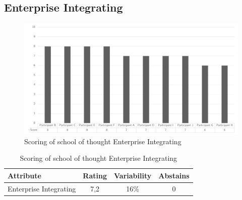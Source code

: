 \subsection{Enterprise Integrating}
\begin{figure}[h!]
	\centering
	\includegraphics[width=0.9\linewidth]{images/scoreeaschoolenterpriseintegrating}
	\caption[Scoring of school of thought Enterprise Integrating]{Scoring of school of thought Enterprise Integrating}
	\label{fig:appscoringschoolenterpriseintegrating}
\end{figure}
\begin{table}[h!]
	\centering
	\begin{tabular}{p{}ccc}
		\toprule
		\textbf{Attribute} & \textbf{Rating} & \textbf{Variability} & \textbf{Abstains} \\
		\midrule
		Enterprise Integrating & 7,2 & 16\% & 0 \\%
		\bottomrule
	\end{tabular}%
	\caption[Scoring of school of thought Enterprise Integrating]{Scoring of school of thought Enterprise Integrating}
	\label{tab:appscoringschoolenterpriseintegrating}%
\end{table}%
\newpage
